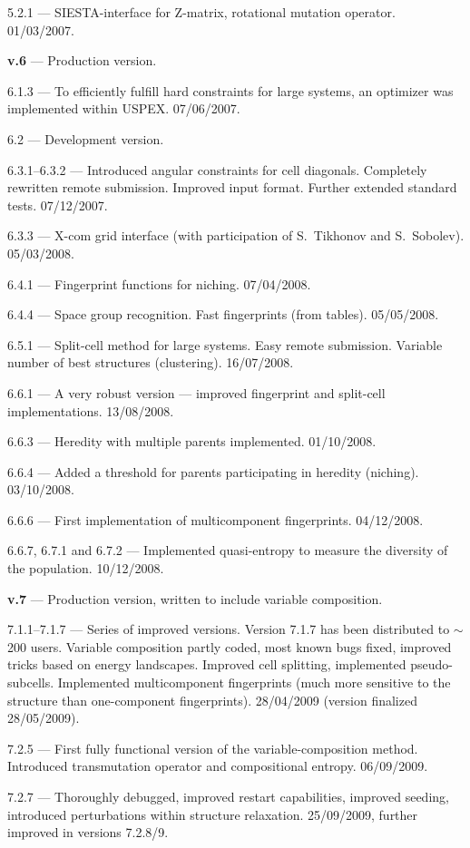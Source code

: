\documentclass[12pt]{article}
\begin{document}
{5.2.1 --- SIESTA-interface for Z-matrix, rotational mutation operator.
01/03/2007.

\textbf{v.6} --- Production version.

6.1.3 --- To efficiently fulfill hard constraints for large systems, an
optimizer was implemented within USPEX. 07/06/2007.

6.2 --- Development version.

6.3.1--6.3.2 --- Introduced angular constraints for cell diagonals. Completely
rewritten remote submission. Improved input format. Further extended standard
tests. 07/12/2007.

6.3.3 --- X-com grid interface (with participation of S.~Tikhonov and
S.~Sobolev). 05/03/2008.

6.4.1 --- Fingerprint functions for niching. 07/04/2008.

6.4.4 --- Space group recognition. Fast fingerprints (from tables). 05/05/2008.

6.5.1 --- Split-cell method for large systems. Easy remote submission.
Variable number of best structures (clustering). 16/07/2008.

6.6.1 --- A very robust version --- improved fingerprint and split-cell
implementations. 13/08/2008.

6.6.3 --- Heredity with multiple parents implemented. 01/10/2008.

6.6.4 --- Added a threshold for parents participating in heredity (niching).
03/10/2008.

6.6.6 --- First implementation of multicomponent fingerprints. 04/12/2008.

6.6.7, 6.7.1 and 6.7.2 --- Implemented quasi-entropy to measure the diversity of
the population. 10/12/2008.

\textbf{v.7} --- Production version, written to include variable composition. 

7.1.1--7.1.7 --- Series of improved versions. Version 7.1.7 has been distributed
to $\sim$200 users. Variable composition partly coded, most known bugs fixed,
improved tricks based on energy landscapes. Improved cell splitting, implemented
pseudo-subcells. Implemented multicomponent fingerprints (much more sensitive to
the structure than one-component fingerprints). 28/04/2009 (version finalized
28/05/2009).

7.2.5 --- First fully functional version of the variable-composition method.
Introduced transmutation operator and compositional entropy. 06/09/2009.

7.2.7 --- Thoroughly debugged, improved restart capabilities, improved seeding,
introduced perturbations within structure relaxation. 25/09/2009, further
improved in versions 7.2.8/9.

}
\end{document}

